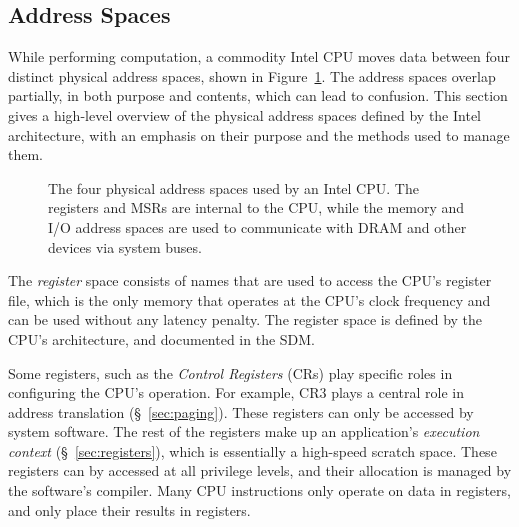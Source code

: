 \subsection{Address Spaces}
\label{sec:address_spaces}

While performing computation, a commodity Intel CPU moves data between four
distinct physical address spaces, shown in Figure~\ref{fig:address_spaces}. The
address spaces overlap partially, in both purpose and contents, which can lead
to confusion. This section gives a high-level overview of the physical address
spaces defined by the Intel architecture, with an emphasis on their purpose and
the methods used to manage them.

\begin{figure}[hbtp]
  \caption{
    The four physical address spaces used by an Intel CPU. The registers and
    MSRs are internal to the CPU, while the memory and I/O address spaces are
    used to communicate with DRAM and other devices via system buses.
  }
  \label{fig:address_spaces}
\end{figure}

The \textit{register} space consists of names that are used to access the CPU's
register file, which is the only memory that operates at the CPU's clock
frequency and can be used without any latency penalty. The register space is
defined by the CPU's architecture, and documented in the SDM.

Some registers, such as the \textit{Control Registers} (CRs) play specific
roles in configuring the CPU's operation. For example, CR3 plays a central role
in address translation (\S~\ref{sec:paging}). These registers can only be
accessed by system software. The rest of the registers make up an application's
\textit{execution context} (\S~\ref{sec:registers}), which is essentially a
high-speed scratch space. These registers can by accessed at all privilege
levels, and their allocation is managed by the software's compiler. Many CPU
instructions only operate on data in registers, and only place their results in
registers.

